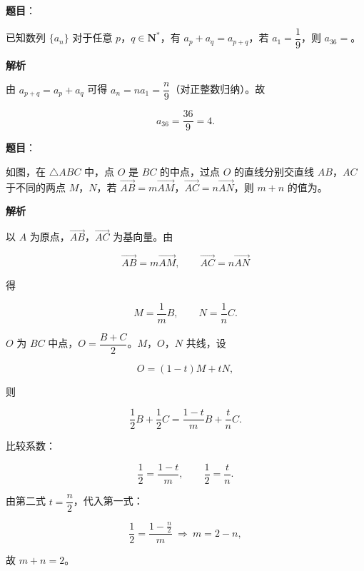 \begin{answer}

\textbf{题目}：

已知数列 $\{a_n\}$ 对于任意 $p$，$q\in\mathbf N^*$，有 $a_p+a_q=a_{p+q}$，若 $a_1=\dfrac19$，则 $a_{36}=$\gkblank{}。

\textbf{解析}

由 $a_{p+q}=a_p+a_q$ 可得 $a_n=na_1=\dfrac n9$（对正整数归纳）。故

\nopagebreak[4]
\[a_{36}=\frac{36}{9}=4.\]


\end{answer}
\begin{answer}

\textbf{题目}：

如图，在 $\triangle ABC$ 中，点 $O$ 是 $BC$ 的中点，过点 $O$ 的直线分别交直线 $AB$，$AC$ 于不同的两点 $M$，$N$，若 $\overrightarrow{AB}=m\overrightarrow{AM}$，$\overrightarrow{AC}=n\overrightarrow{AN}$，则 $m+n$ 的值为\gkblank{}。
\nopagebreak[4]
\begin{center}\end{center}
\nopagebreak[4]
\textbf{解析}

以 $A$ 为原点，$\overrightarrow{AB}$，$\overrightarrow{AC}$ 为基向量。由

\nopagebreak[4]
\[\overrightarrow{AB}=m\overrightarrow{AM},\qquad \overrightarrow{AC}=n\overrightarrow{AN}\]

得

\nopagebreak[4]
\[M=\frac1mB,\qquad N=\frac1nC.\]

$O$ 为 $BC$ 中点，$O=\dfrac{B+C}{2}$。$M$，$O$，$N$ 共线，设

\nopagebreak[4]
\[O=(1-t)M+tN,\]

则

\nopagebreak[4]
\[\frac12B+\frac12C=\frac{1-t}{m}B+\frac tnC.\]

比较系数：

\nopagebreak[4]
\[\frac12=\frac{1-t}{m},\qquad \frac12=\frac tn.\]

由第二式 $t=\dfrac n2$，代入第一式：

\nopagebreak[4]
\[\frac12=\frac{1-\frac n2}{m}\ \Rightarrow\ m=2-n,\]

故 $m+n=2$。


\end{answer}

